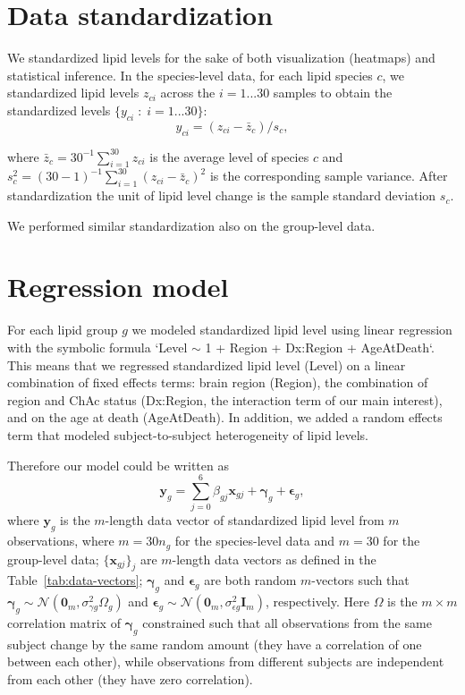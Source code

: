 \documentclass[letterpaper]{article}
\begin{document}
\section{Data standardization}

We standardized lipid levels for the sake of both visualization (heatmaps) and
statistical inference.  In the species-level data, for each lipid species $c$,
we standardized lipid levels $z_{ci}$ across the $i = 1...30$ samples to
obtain the standardized levels $\{y_{ci}\;:\; i = 1...30\}$:
\begin{equation}
	y_{ci} = (z_{ci} - \bar{z}_c) / s_c,
\end{equation}

where $\bar{z}_c = 30^{-1} \sum_{i=1}^{30} z_{ci}$ is the average level of
species $c$ and $s^2_c = (30 - 1)^{-1} \sum_{i=1}^{30} (z_{ci} - \bar{z}_c)^2$
is the corresponding sample variance.  After standardization the unit of lipid
level change is the sample standard deviation $s_c$.

We performed similar standardization also on the group-level data.

\section{Regression model}

For each lipid group $g$ we modeled standardized lipid level using linear
regression with the symbolic formula `Level $\sim$ 1 + Region + Dx:Region +
AgeAtDeath`.  This means that we regressed standardized lipid level (Level) on
a linear combination of fixed effects terms: brain region (Region), the
combination of region and ChAc status (Dx:Region, the interaction term of our
main interest), and on the age at death (AgeAtDeath).  In addition, we added a
random effects term that modeled subject-to-subject heterogeneity of lipid
levels.

Therefore our model could be written as
\begin{equation}
	\mathbf{y}_{g} = \sum_{j=0}^{6} \beta_{gj} \mathbf{x}_{gj} + \mathbf{\gamma}_{g} + \mathbf{\epsilon}_{g},
	\label{eq:main-model}
\end{equation}
where $\mathbf{y}_{g}$ is the $m$-length data vector of standardized lipid
level from $m$ observations, where $m = 30 n_g$ for the species-level data and
$m = 30$ for the group-level data; $\{\mathbf{x}_{gj}\}_j$ are $m$-length
data vectors as defined in the Table~\ref{tab:data-vectors};
$\mathbf{\gamma}_{g}$ and $\mathbf{\epsilon}_{g}$ are both random $m$-vectors
such that
$\mathbf{\gamma}_{g} \sim \mathcal{N}(\mathbf{0}_m, \sigma^2_{\gamma
g}\Omega_g)$ and
$\mathbf{\epsilon}_{g} \sim \mathcal{N}(\mathbf{0}_m, \sigma^2_{\epsilon g}
\mathbf{I}_m)$, respectively.  Here $\Omega$ is the $m \times m$ correlation
matrix of $\mathbf{\gamma}_{g}$ constrained such that all observations from
the same subject change by the same random amount (they have a correlation of
one between each other), while observations from different subjects are
independent from each other (they have zero correlation).
\end{document}

